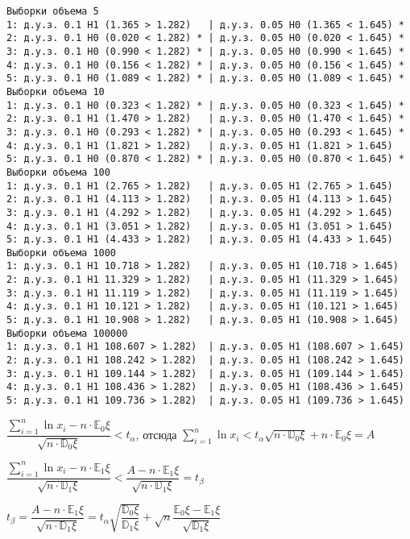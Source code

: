 \documentclass[11pt]{article}
\begin{document}
    \begin{Verbatim}[commandchars=\\\{\}]
Выборки объема 5
1: д.у.з. 0.1 H1 (1.365 > 1.282)   | д.у.з. 0.05 H0 (1.365 < 1.645) *
2: д.у.з. 0.1 H0 (0.020 < 1.282) * | д.у.з. 0.05 H0 (0.020 < 1.645) *
3: д.у.з. 0.1 H0 (0.990 < 1.282) * | д.у.з. 0.05 H0 (0.990 < 1.645) *
4: д.у.з. 0.1 H0 (0.156 < 1.282) * | д.у.з. 0.05 H0 (0.156 < 1.645) *
5: д.у.з. 0.1 H0 (1.089 < 1.282) * | д.у.з. 0.05 H0 (1.089 < 1.645) *
Выборки объема 10
1: д.у.з. 0.1 H0 (0.323 < 1.282) * | д.у.з. 0.05 H0 (0.323 < 1.645) *
2: д.у.з. 0.1 H1 (1.470 > 1.282)   | д.у.з. 0.05 H0 (1.470 < 1.645) *
3: д.у.з. 0.1 H0 (0.293 < 1.282) * | д.у.з. 0.05 H0 (0.293 < 1.645) *
4: д.у.з. 0.1 H1 (1.821 > 1.282)   | д.у.з. 0.05 H1 (1.821 > 1.645) 
5: д.у.з. 0.1 H0 (0.870 < 1.282) * | д.у.з. 0.05 H0 (0.870 < 1.645) *
Выборки объема 100
1: д.у.з. 0.1 H1 (2.765 > 1.282)   | д.у.з. 0.05 H1 (2.765 > 1.645) 
2: д.у.з. 0.1 H1 (4.113 > 1.282)   | д.у.з. 0.05 H1 (4.113 > 1.645) 
3: д.у.з. 0.1 H1 (4.292 > 1.282)   | д.у.з. 0.05 H1 (4.292 > 1.645) 
4: д.у.з. 0.1 H1 (3.051 > 1.282)   | д.у.з. 0.05 H1 (3.051 > 1.645) 
5: д.у.з. 0.1 H1 (4.433 > 1.282)   | д.у.з. 0.05 H1 (4.433 > 1.645) 
Выборки объема 1000
1: д.у.з. 0.1 H1 10.718 > 1.282)   | д.у.з. 0.05 H1 (10.718 > 1.645) 
2: д.у.з. 0.1 H1 11.329 > 1.282)   | д.у.з. 0.05 H1 (11.329 > 1.645) 
3: д.у.з. 0.1 H1 11.119 > 1.282)   | д.у.з. 0.05 H1 (11.119 > 1.645) 
4: д.у.з. 0.1 H1 10.121 > 1.282)   | д.у.з. 0.05 H1 (10.121 > 1.645) 
5: д.у.з. 0.1 H1 10.908 > 1.282)   | д.у.з. 0.05 H1 (10.908 > 1.645) 
Выборки объема 100000
1: д.у.з. 0.1 H1 108.607 > 1.282)  | д.у.з. 0.05 H1 (108.607 > 1.645) 
2: д.у.з. 0.1 H1 108.242 > 1.282)  | д.у.з. 0.05 H1 (108.242 > 1.645) 
3: д.у.з. 0.1 H1 109.144 > 1.282)  | д.у.з. 0.05 H1 (109.144 > 1.645) 
4: д.у.з. 0.1 H1 108.436 > 1.282)  | д.у.з. 0.05 H1 (108.436 > 1.645) 
5: д.у.з. 0.1 H1 109.736 > 1.282)  | д.у.з. 0.05 H1 (109.736 > 1.645) 
\end{Verbatim}

    \(\dfrac{\sum\limits_{i=1}^{n}\ln{x_i}-n\cdot\mathbb{E}_0 \xi}{\sqrt{n\cdot\mathbb{D}_0 \xi}}<t_{\alpha}\),
отсюда
\(\sum\limits_{i=1}^{n}\ln{x_i}<t_{\alpha}\sqrt{n\cdot\mathbb{D}_0 \xi}+n\cdot\mathbb{E}_0 \xi=A\)

\(\dfrac{\sum\limits_{i=1}^{n}\ln{x_i}-n\cdot\mathbb{E}_1 \xi}{\sqrt{n\cdot\mathbb{D}_1 \xi}}< \dfrac{A-n\cdot\mathbb{E}_1 \xi}{\sqrt{n\cdot\mathbb{D}_1 \xi}}=t_{\beta}\)

\(t_{\beta}=\dfrac{A-n\cdot\mathbb{E}_1 \xi}{\sqrt{n\cdot\mathbb{D}_1 \xi}}= t_{\alpha}\sqrt{\dfrac{\mathbb{D}_0 \xi}{\mathbb{D}_1 \xi}}+\sqrt{n}\dfrac{\mathbb{E}_0 \xi-\mathbb{E}_1 \xi}{\sqrt{\mathbb{D}_1 \xi}}\)
\end{document}
